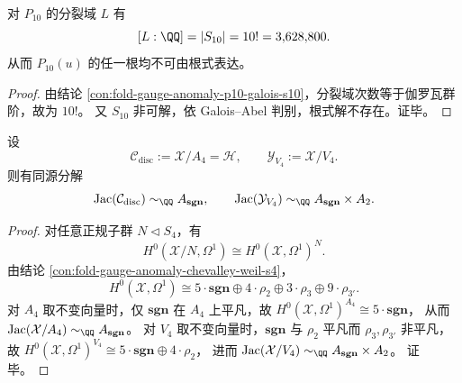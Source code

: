 \begin{corollary}[分裂域次数与分支根不可根式性]\label{cor:fold-gauge-anomaly-p10-degree-and-unsolvability}
对 \(P_{10}\) 的分裂域 \(L\) 有
\[
[L:\QQ]=|S_{10}|=10!=3{,}628{,}800.
\]
从而 \(P_{10}(u)\) 的任一根均不可由根式表达。
\end{corollary}
\begin{proof}
由结论 \ref{con:fold-gauge-anomaly-p10-galois-s10}，分裂域次数等于伽罗瓦群阶，故为 \(10!\)。
又 \(S_{10}\) 非可解，依 Galois--Abel 判别，根式解不存在。证毕。
\end{proof}

\begin{corollary}\label{cor:fold-gauge-anomaly-quotient-jacobians-isotypic}
设
\[
\mathcal C_{\mathrm{disc}}:=\mathcal X/A_4=\mathcal H,
\qquad
\mathcal Y_{V_4}:=\mathcal X/V_4.
\]
则有同源分解
\[
\mathrm{Jac}(\mathcal C_{\mathrm{disc}})\sim_{\QQ}A_{\mathbf{sgn}},
\qquad
\mathrm{Jac}(\mathcal Y_{V_4})\sim_{\QQ}A_{\mathbf{sgn}}\times A_2.
\]
\end{corollary}
\begin{proof}
对任意正规子群 \(N\triangleleft S_4\)，有
\[
H^0(\mathcal X/N,\Omega^1)\cong H^0(\mathcal X,\Omega^1)^N.
\]
由结论 \ref{con:fold-gauge-anomaly-chevalley-weil-s4}，
\[
H^0(\mathcal X,\Omega^1)\cong
5\cdot \mathbf{sgn}\oplus 4\cdot \rho_2\oplus 3\cdot \rho_3\oplus 9\cdot \rho_{3'}.
\]
对 \(A_4\) 取不变向量时，仅 \(\mathbf{sgn}\) 在 \(A_4\) 上平凡，故
\(
H^0(\mathcal X,\Omega^1)^{A_4}\cong 5\cdot\mathbf{sgn}
\)，
从而 \(\mathrm{Jac}(\mathcal X/A_4)\sim_{\QQ}A_{\mathbf{sgn}}\)。
对 \(V_4\) 取不变向量时，\(\mathbf{sgn}\) 与 \(\rho_2\) 平凡而 \(\rho_3,\rho_{3'}\) 非平凡，故
\(
H^0(\mathcal X,\Omega^1)^{V_4}\cong 5\cdot\mathbf{sgn}\oplus 4\cdot\rho_2
\)，
进而
\(
\mathrm{Jac}(\mathcal X/V_4)\sim_{\QQ}A_{\mathbf{sgn}}\times A_2
\)。
证毕。
\end{proof}

